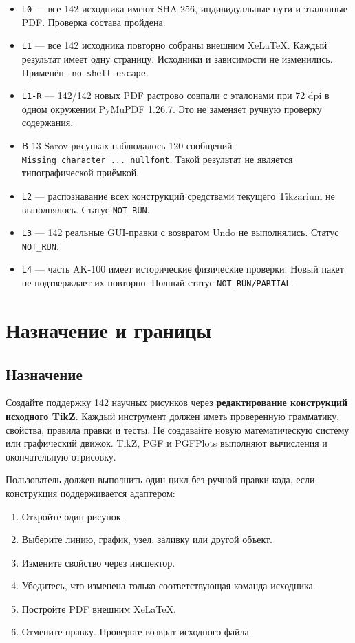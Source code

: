 \documentclass[11pt,a4paper,oneside]{scrreprt}
\providecommand{\tightlist}{\setlength{\itemsep}{0pt}\setlength{\parskip}{0pt}}
\begin{document}
\begin{itemize}
\tightlist
\item
  \texttt{L0} --- все 142 исходника имеют SHA-256, индивидуальные пути и эталонные PDF. Проверка состава пройдена.
\item
  \texttt{L1} --- все 142 исходника повторно собраны внешним XeLaTeX. Каждый результат имеет одну страницу. Исходники и зависимости не изменились. Применён \texttt{-no-shell-escape}.
\item
  \texttt{L1-R} --- 142/142 новых PDF растрово совпали с эталонами при 72 dpi в одном окружении PyMuPDF 1.26.7. Это не заменяет ручную проверку содержания.
\item
  В 13 Sarov-рисунках наблюдалось 120 сообщений \texttt{Missing\ character\ ...\ nullfont}. Такой результат не является типографической приёмкой.
\item
  \texttt{L2} --- распознавание всех конструкций средствами текущего Tikzarium не выполнялось. Статус \texttt{NOT\_RUN}.
\item
  \texttt{L3} --- 142 реальные GUI-правки с возвратом Undo не выполнялись. Статус \texttt{NOT\_RUN}.
\item
  \texttt{L4} --- часть AK-100 имеет исторические физические проверки. Новый пакет не подтверждает их повторно. Полный статус \texttt{NOT\_RUN/PARTIAL}.
\end{itemize}

\chapter{Назначение и границы}\label{ux43dux430ux437ux43dux430ux447ux435ux43dux438ux435-ux438-ux433ux440ux430ux43dux438ux446ux44b}

\section{Назначение}\label{ux43dux430ux437ux43dux430ux447ux435ux43dux438ux435}

Создайте поддержку 142 научных рисунков через \textbf{редактирование конструкций исходного TikZ}. Каждый инструмент должен иметь проверенную грамматику, свойства, правила правки и тесты. Не создавайте новую математическую систему или графический движок. TikZ, PGF и PGFPlots выполняют вычисления и окончательную отрисовку.

Пользователь должен выполнить один цикл без ручной правки кода, если конструкция поддерживается адаптером:

\begin{enumerate}
\def\labelenumi{\arabic{enumi}.}
\tightlist
\item
  Откройте один рисунок.
\item
  Выберите линию, график, узел, заливку или другой объект.
\item
  Измените свойство через инспектор.
\item
  Убедитесь, что изменена только соответствующая команда исходника.
\item
  Постройте PDF внешним XeLaTeX.
\item
  Отмените правку. Проверьте возврат исходного файла.
\end{enumerate}
\end{document}
